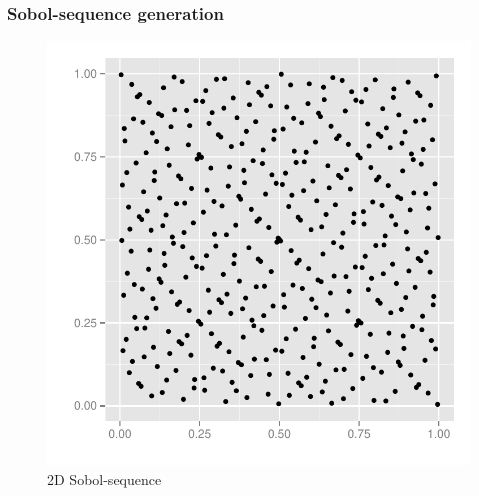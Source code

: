\documentclass{beamer}
\begin{document}
\begin{frame}
  \frametitle{Sobol-sequence generation}
   \vspace{-5mm}
   \begin{minipage}[t]{0.48\linewidth}
     \begin{figure}
       \centering
       \includegraphics[width=\textwidth]{graphics/2D-sobol-sequence.pdf}
       \vspace{-5mm}
       \caption{2D Sobol-sequence}
   \label{fig:2dsobolseq}
 \end{figure}


\end{minipage}
\end{frame}
\end{document}
